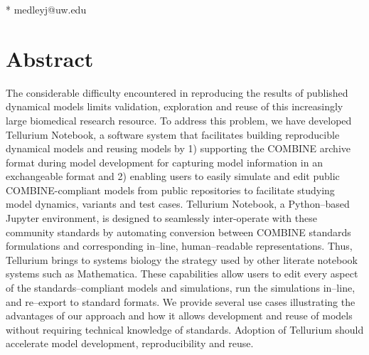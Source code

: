 \documentclass[10pt,letterpaper]{article}
\begin{document}
\begin{flushleft}


* medleyj@uw.edu

\end{flushleft}
%
%
\section*{Abstract}
The considerable difficulty encountered in reproducing the results of published dynamical models limits validation, exploration and reuse of this increasingly large biomedical research resource.   %
To address this problem, we have developed Tellurium Notebook, a software system that facilitates building reproducible dynamical models and reusing models by 1) supporting the COMBINE archive format during model development for capturing model information in an exchangeable format and 2) enabling users to easily simulate and edit public COMBINE-compliant models from public repositories to facilitate studying model dynamics, variants and test cases. Tellurium Notebook, a Python--based Jupyter environment, is designed to seamlessly inter-operate with these community standards by automating conversion between COMBINE standards formulations and corresponding in--line, human--readable representations. Thus, Tellurium brings to systems biology the strategy used by other literate notebook systems such as Mathematica. These capabilities allow users to edit every aspect of the standards--compliant models and simulations, run the simulations in--line, and re--export to standard formats. We provide several use cases illustrating the advantages of our approach and how it  allows development and reuse of models without requiring technical knowledge of standards. Adoption of Tellurium should accelerate model development, reproducibility and reuse.
\end{document}
